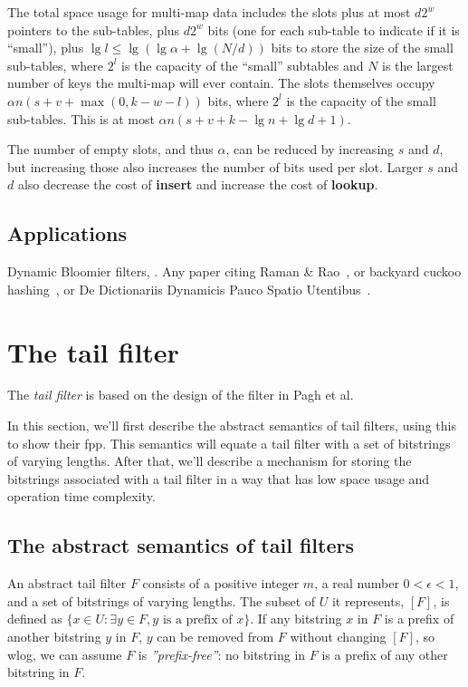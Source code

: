 \documentclass[11pt,letterpaper]{article}
\begin{document}
The total space usage for multi-map data includes the slots plus at most $d 2^w$ pointers to the sub-tables, plus $d 2^w$ bits (one for each sub-table to indicate if it is ``small''), plus $\lg l \leq \lg (\lg \alpha + \lg (N/d))$ bits to store the size of the small sub-tables, where $2^l$ is the capacity of the ``small'' subtables and $N$ is the largest number of keys the multi-map will ever contain.
The slots themselves occupy $\alpha n (s + v + \max(0, k - w - l))$ bits, where $2^l$ is the capacity of the small sub-tables.
This is at most $\alpha n (s + v + k - \lg n + \lg d + 1)$.

The number of empty slots, and thus $\alpha$, can be reduced by increasing $s$ and $d$, but increasing those also increases the number of bits used per slot.
Larger $s$ and $d$ also decrease the cost of {\bf insert} and increase the cost of {\bf lookup}.


\subsection{Applications}

Dynamic Bloomier filters, \cite{DBLP:journals/corr/abs-cs-0502032}. Any paper citing Raman \& Rao~\cite{raman2003succinct}, or backyard cuckoo hashing~\cite{DBLP:journals/corr/abs-0912-5424}, or De Dictionariis Dynamicis Pauco Spatio Utentibus~\cite{DBLP:journals/corr/abs-cs-0512081}.

\section{The tail filter}

The {\em tail filter} is based on the design of the filter in Pagh et al.~\cite{DBLP:journals/corr/abs-1304-1188}

In this section, we'll first describe the abstract semantics of tail filters, using this to show their fpp.
This semantics will equate a tail filter with a set of bitstrings of varying lengths.
After that, we'll describe a mechanism for storing the bitstrings associated with a tail filter in a way that has low space usage and operation time complexity.

\subsection{The abstract semantics of tail filters}

An abstract tail filter $F$ consists of a positive integer $m$, a real number $0 < \epsilon < 1$, and a set of bitstrings of varying lengths. %
The subset of $U$ it represents, $[F]$, is defined as $\{x \in U : \exists y \in F, y \textrm{ is a prefix of } x\}$.
If any bitstring $x$ in $F$ is a prefix of another bitstring $y$ in $F$, $y$ can be removed from $F$ without changing $[F]$, so wlog, we can assume $F$ is {\em ''prefix-free''}: no bitstring in $F$ is a prefix of any other bitstring in $F$.
\end{document}
